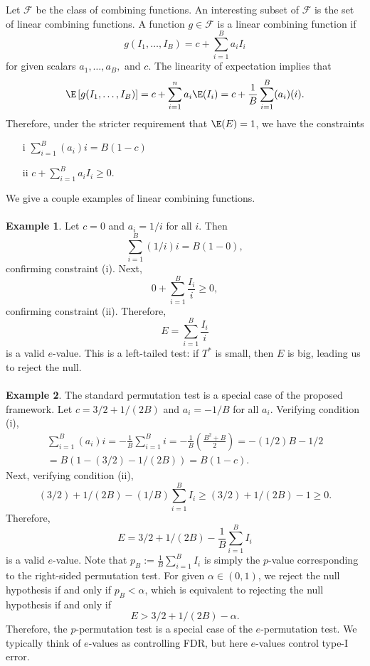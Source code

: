 \documentclass[12pt]{article}
\begin{document}
Let $\mathcal{F}$ be the class of combining functions. An interesting subset of $\mathcal{F}$ is the set of linear combining functions. A function $g \in \mathcal{F}$ is a linear combining function if
$$ g(I_1, \dots, I_B) = c + \sum_{i=1}^B a_i I_i $$ for given scalars $a_1, \dots, a_B,$ and $c.$ The linearity of expectation implies that
$$ \E\left[ g(I_1, \dots, I_B) \right] = c + \sum_{i=1}^n a_i \E(I_i) = c + \frac{1}{B} \sum_{i=1}^B (a_i)(i).$$ Therefore, under the stricter requirement that $\E(E) = 1$, we have the constraints
\begin{itemize}
\item[i] $\sum_{i=1}^B (a_i) i = B(1-c)$
\item[ii] $c + \sum_{i=1}^B a_i I_i \geq 0.$
\end{itemize}
We give a couple examples of linear combining functions. 
\\ \\
\noindent
\textbf{Example 1}. Let $c = 0$ and $a_i = 1/i$ for all $i$. Then 
$$ \sum_{i=1}^B (1/i) i = B(1 - 0),$$ confirming constraint (i). Next, $$ 0 + \sum_{i=1}^B \frac{I_i}{i} \geq 0,$$ confirming constraint (ii). Therefore,
$$ E = \sum_{i=1}^B \frac{I_i}{i}$$ is a valid $e$-value. This is a left-tailed test: if $T^*$ is small, then $E$ is big, leading us to reject the null.
\\ \\
\noindent
\textbf{Example 2}. The standard permutation test is a special case of the proposed framework. Let $c = 3/2 + 1/(2B)$ and $a_i = -1/B$ for all $a_i$. Verifying condition (i),
\begin{multline*}
\sum_{i=1}^B (a_i)i = - \frac{1}{B} \sum_{i=1}^B i =  -\frac{1}{B} \left( \frac{B^2 + B}{2} \right) = -(1/2)B - 1/2 \\ = B(1 - (3/2) - 1/(2B)) = B(1-c).
\end{multline*}
Next, verifying condition (ii),
$$ (3/2) + 1/(2B) -(1/B) \sum_{i=1}^B I_i \geq (3/2) +1/(2B) - 1 \geq 0.$$
Therefore,
$$E =  3/2 + 1/(2B) - \frac{1}{B}\sum_{i=1}^B I_i$$ is a valid $e$-value. Note that $p_B := \frac{1}{B} \sum_{i=1}^B I_i$ is simply the $p$-value corresponding to the right-sided permutation test. For given $\alpha \in (0,1)$, we reject the null hypothesis if and only if $p_B < \alpha$, which is equivalent to rejecting the null hypothesis if and only if 
$$ E > 3/2 + 1/(2B) - \alpha.$$
Therefore, the $p$-permutation test is a special case of the $e$-permutation test. We typically think of $e$-values as controlling FDR, but here $e$-values control type-I error.
\end{document}

